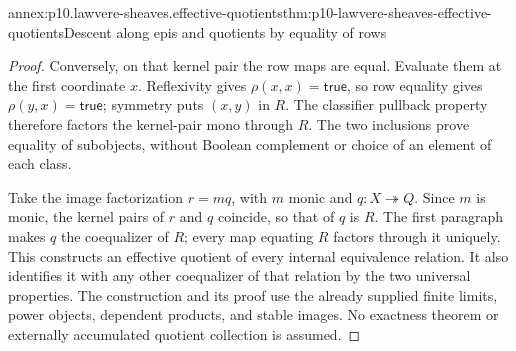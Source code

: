 \begin{annexitem}{annex:p10.lawvere-sheaves.effective-quotients}{thm:p10-lawvere-sheaves-effective-quotients}{Descent along epis and quotients by equality of rows}
\begin{proof}
Conversely, on that kernel pair the row maps are equal.
Evaluate them at the first coordinate \(x\).  Reflexivity
gives \(\rho(x,x)=\mathsf{true}\), so row equality
gives \(\rho(y,x)=\mathsf{true}\); symmetry puts
\((x,y)\) in \(R\).  The classifier pullback property
therefore factors the kernel-pair mono through \(R\).
The two inclusions prove equality of subobjects, without
Boolean complement or choice of an element of each class.

Take the image factorization \(r=mq\), with \(m\)
monic and \(q:X\twoheadrightarrow Q\).  Since \(m\)
is monic, the kernel pairs of \(r\) and \(q\) coincide,
so that of \(q\) is \(R\).  The first paragraph makes
\(q\) the coequalizer of \(R\); every map equating
\(R\) factors through it uniquely.  This constructs an
effective quotient of every internal equivalence relation.
It also identifies it with any other coequalizer of that
relation by the two universal properties.  The construction
and its proof use the already supplied finite limits,
power objects, dependent products, and stable images.
No exactness theorem or externally accumulated quotient
collection is assumed.
\end{proof}
\end{annexitem}

